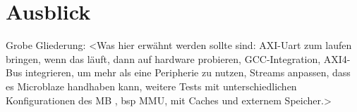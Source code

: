 \chapter{Ausblick}
Grobe Gliederung:
<Was hier erwähnt werden sollte sind: AXI-Uart zum laufen bringen, wenn das läuft, dann auf hardware probieren, GCC-Integration, AXI4-Bus integrieren, um mehr als eine Peripherie zu nutzen, \textmu\/Streams anpassen, dass es Microblaze handhaben kann, weitere Tests mit unterschiedlichen Konfigurationen des MB , bsp MMU, mit Caches und externem Speicher.>